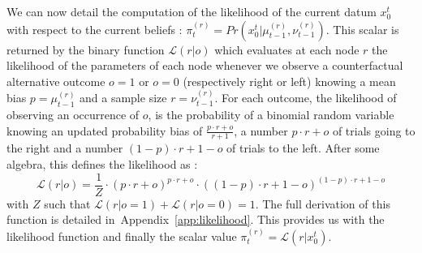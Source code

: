 \documentclass[10pt,letterpaper]{article}
\newcommand{\eq}[1]{\begin{equation*}#1\end{equation*}}
\newcommand{\eql}[1]{\begin{equation}#1\end{equation}}
\newcommand{\Ll}{\mathcal{L}}
\newcommand{\seeApp}[1]{Appendix~\ref{app:#1}}
\begin{document}
We can now detail the computation of the likelihood of the current datum $x_0^{t}$ with respect to
the current beliefs : $\pi^{(r)}_t = Pr( x_0^{t} |  \mu^{(r)}_{t-1}, \nu^{(r)}_{t-1})$. %
This scalar is returned by the binary function
$\Ll(r | o)$ which evaluates at each node $r$ the likelihood of the parameters of each node
whenever we observe a counterfactual alternative outcome $o=1$ or $o=0$
(respectively right or left)
knowing a mean bias $p=\mu^{(r)}_{t-1}$
and a sample size $r=\nu^{(r)}_{t-1}$.
For each outcome, the likelihood of observing an occurrence of $o$,
is the probability of a binomial random variable knowing
an updated probability bias of $\frac{p \cdot r + o}{r+1}$,
a number $p \cdot r + o$ of trials going to the right and
a number $(1-p) \cdot r + 1 - o$ of trials to the left.
After some algebra, this defines the likelihood as :
\eql{
\Ll(r | o) = \frac{1}{Z} \cdot {(p \cdot r + o)}^{p \cdot r + o} \cdot {((1- p)\cdot r + 1- o)}^{(1- p)\cdot r + 1- o}
\label{eq:likelihood}
}
with $Z$ such that $\Ll(r | o=1) + \Ll(r | o=0)=1$. %
The full derivation of this function is detailed in~\seeApp{likelihood}.
This provides us with the likelihood function
and finally the scalar value $\pi^{(r)}_t = \Ll(r | x_0^{t})$.
\end{document}
